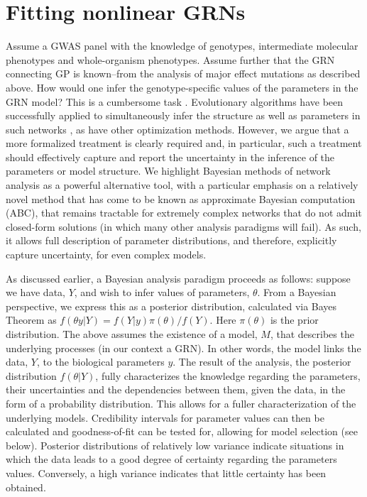 \section{Fitting nonlinear GRNs}
Assume a GWAS panel with the knowledge of genotypes, intermediate molecular phenotypes and whole-organism phenotypes. Assume further that the GRN connecting GP is known–from the analysis of major effect mutations as described above. How would one infer the genotype-specific values of the parameters in the GRN model? This is a cumbersome task \cite{Locke2005b}. Evolutionary algorithms have been successfully applied to simultaneously infer the structure as well as parameters in such networks \cite{Ando2003, Streichert2004}, as have other optimization methods. However, we argue that a more formalized treatment is clearly required and, in particular, such a treatment should effectively capture and report the uncertainty in the inference of the parameters or model structure. We highlight Bayesian methods of network analysis as a powerful alternative tool, with a particular emphasis on a relatively novel method that has come to be known as approximate Bayesian computation (ABC), that remains tractable for extremely complex networks that do not admit closed-form solutions (in which many other analysis paradigms will fail). As such, it allows full description of parameter distributions, and therefore, explicitly capture uncertainty, for even complex models.

As discussed earlier, a Bayesian analysis paradigm proceeds as follows: suppose we have data, $Y$, and wish to infer values of parameters, $\theta$. From a Bayesian perspective, we express this as a posterior distribution, calculated via Bayes Theorem as $f(\theta y|Y) = f(Y|y)\pi(\theta)/f(Y)$. Here $\pi(\theta)$ is the prior distribution. The above assumes the existence of a model, $M$, that describes the underlying processes (in our context a GRN). In other words, the model links the data, $Y$, to the biological parameters $y$. The result of the analysis, the posterior distribution $f(\theta|Y)$, fully characterizes the knowledge regarding the parameters, their uncertainties and the dependencies between them, given the data, in the form of a probability distribution. This allows for a fuller characterization of the underlying models. Credibility intervals for parameter values can then be calculated and goodness-of-fit can be tested for, allowing for model selection (see below). Posterior distributions of relatively low variance indicate situations in which the data leads to a good degree of certainty regarding the parameters values. Conversely, a high variance indicates that little certainty has been obtained.


